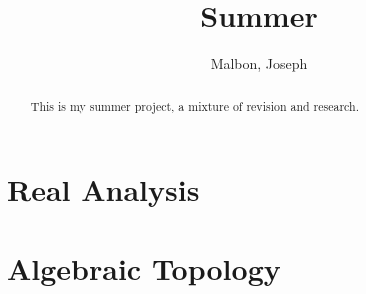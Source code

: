 \documentclass{article}
\title{Summer}
\author{Malbon, Joseph}
\theoremstyle{BreakBold}
\theoremstyle{example}
\theoremstyle{definition}
\begin{document}
\begin{titlingpage}
\maketitle
\begin{abstract}
This is my summer project, a mixture of revision and research.
\end{abstract}
\tableofcontents
\end{titlingpage}

\newpage
\section{Real Analysis}\label{sec:1}


\newpage
\section{Algebraic Topology}\label{sec:2}

\end{document}
